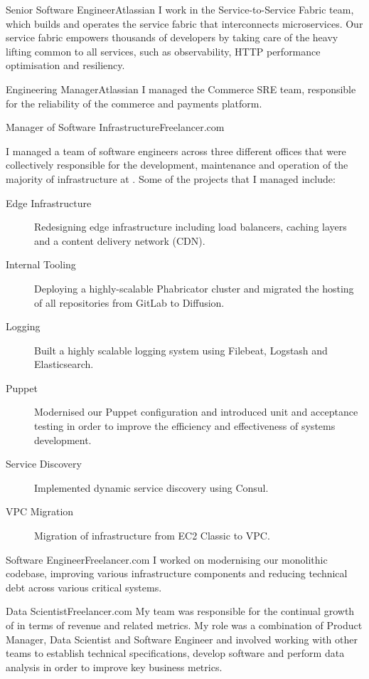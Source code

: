 \begin{professionalExperience}

{Senior Software Engineer}{Atlassian}
{
  I work in the Service-to-Service Fabric team, which builds and operates the
  service fabric that interconnects  microservices. Our
  service fabric empowers thousands of developers by taking care of the heavy
  lifting common to all services, such as observability, HTTP performance
  optimisation and resiliency.
}

{Engineering Manager}{Atlassian}
{
  I managed the Commerce SRE team, responsible for the reliability of the
  commerce and payments platform.
}

{Manager of Software Infrastructure}{Freelancer.com}
{
  I managed a team of software engineers across three different offices that
  were collectively responsible for the development, maintenance and operation
  of the majority of infrastructure at . Some of the
  projects that I managed include:

  \begin{description}
    \item[Edge Infrastructure] Redesigning edge infrastructure including load
      balancers, caching layers and a content delivery network (CDN).
    \item[Internal Tooling] Deploying a highly-scalable Phabricator cluster and
      migrated the hosting of all repositories from GitLab to Diffusion.
    \item[Logging] Built a highly scalable logging system using Filebeat,
      Logstash and Elasticsearch.
    \item[Puppet] Modernised our Puppet configuration and introduced unit and
      acceptance testing in order to improve the efficiency and effectiveness of
      systems development.
    \item[Service Discovery] Implemented dynamic service discovery using Consul.
    \item[VPC Migration] Migration of infrastructure from EC2 Classic to VPC\@.
  \end{description}
}

{Software Engineer}{Freelancer.com}
{
  I worked on modernising our monolithic codebase, improving various
  infrastructure components and reducing technical debt across various critical
  systems.
}

{Data Scientist}{Freelancer.com}
{
  My team was responsible for the continual growth of 
  in terms of revenue and related metrics. My role was a combination of Product
  Manager, Data Scientist and Software Engineer and involved working with other
  teams to establish technical specifications, develop software and perform data
  analysis in order to improve key business metrics.
}

\end{professionalExperience}
